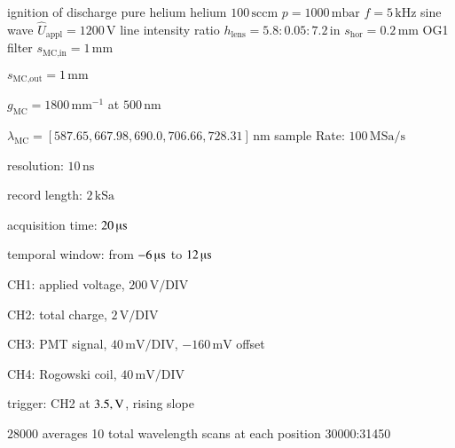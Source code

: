 \begin{Liste}
	\itemwas ignition of discharge
	 pure helium
	 helium $100\,\text{sccm}$
	 $p=1000\,\text{mbar}$
	 $f=5\,\text{kHz}$
	 sine wave
	 $\hat U_\text{appl}=1200\,\text{V}$
	\leer
	\itemwas line intensity ratio
	 $h_\text{lens}=5.8:0.05:7.2\,\text{in}$
	 $s_\text{hor}=0.2\,\text{mm}$
	 OG1 filter
 	 $s_\text{MC,in}=1\,\text{mm}$
	\item $s_\text{MC,out}=1\,\text{mm}$
	\item $g_\text{MC}=1800\,\text{mm}^{-1}$ at $500\,\text{nm}$
	\item $\lambda_\text{MC}=[587.65,667.98,690.0,706.66,728.31]\,\text{nm}$
	\leer
	 sample Rate: $100\,\text{MSa}/\text{s}$
	\item resolution: $10\,\text{ns}$
	\item record length: $2\,\text{kSa}$
	\item acquisition time: $20\,\text{\textmu s}$
	\item temporal window: from $-6\,\text{\textmu s}$ to $12\,\text{\textmu s}$
	\item CH1: applied voltage, $200\,\text{V}/\text{DIV}$
	\item CH2: total charge, $2\,\text{V}/\text{DIV}$
	\item CH3: PMT signal, $40\,\text{mV}/\text{DIV}$, $-160\,\text{mV}$ offset
	\item CH4: Rogowski coil, $40\,\text{mV}/\text{DIV}$
	\item trigger: CH2 at $\-3.5,\text{V}$, rising slope
	\item $28000$ averages
	 10 total wavelength scans at each position
	\leer
	 30000:31450
\end{Liste}